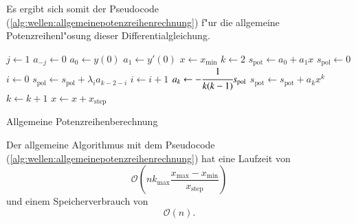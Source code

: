 Es ergibt sich somit der 
Pseudocode (\ref{alg:wellen:allgemeinepotenzreihenrechnung}) f"ur die 
allgemeine Potenzreihenl"osung dieser Differentialgleichung.

\begin{algorithm}
	\begin{algorithmic}[1]
		\State $j \gets 1$
			\State $a_{-j} \gets 0$
		\EndFor
		\State $a_0 \gets y(0)$
		\State $a_1 \gets y'(0)$
		\State $x \gets x_{\text{min}}$
			\State $k \gets 2$
			\State $s_{\text{pot}} \gets a_0 + a_1x$
				\State $s_{\text{pol}} \gets 0$
				\State $i \gets 0$
					\State $s_{\text{pol}} \gets s_{\text{pol}}+\lambda_i 
					a_{k-2-i}$
					\State $i \gets i + 1$
				\EndFor
				\State $a_k \gets -\cfrac{1}{k(k-1)} s_{\text{pol}}$
				\State $s_{\text{pot}} \gets s_{\text{pot}} + a_k x^k$
				\State $k \gets k + 1$
			\EndFor
			\State $x \gets x + x_{\text{step}}$
		\EndFor
	\end{algorithmic}
	
	\caption{Allgemeine Potenzreihenberechnung} 
	\label{alg:wellen:allgemeinepotenzreihenrechnung}
\end{algorithm}

Der allgemeine Algorithmus mit dem Pseudocode 
(\ref{alg:wellen:allgemeinepotenzreihenrechnung}) hat eine Laufzeit von
\begin{equation*}
	\mathcal{O}
	\left(
		nk_{\text{max}}\frac{x_{\text{max}}-x_{\text{min}}}{x_{\text{step}}}
	\right)
\end{equation*}
und einem Speicherverbrauch von
\begin{equation*}
	\mathcal{O}
	\left(
		n
	\right).
\end{equation*}